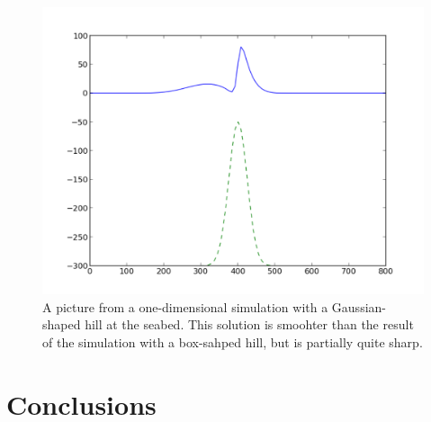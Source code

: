 \documentclass[twoside]{article}
\begin{document}
\begin{figure} 
  \centering
  \includegraphics[scale=0.4]{gustavs_codes/movie_1dwave_gaussian_Bs250/figure.pdf}
  \caption{A picture from a one-dimensional simulation with a Gaussian-shaped hill at the seabed. This solution is smoohter than the result of the simulation with a box-sahped hill, but is partially quite sharp.} %
\end{figure}

\section{Conclusions}


\printindex
\end{document}
